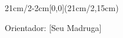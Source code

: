 


\begin{textblock*}{21cm/2-2cm}[0,0](21cm/2,15cm)
  \begin{flushleft}
    

    {\large
      Orientador: [Seu Madruga]
    }
  \end{flushleft}
\end{textblock*}

